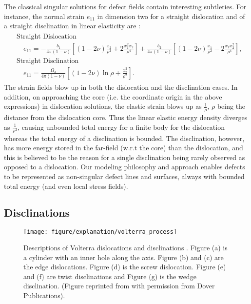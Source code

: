 \documentclass[11pt,letterpaper]{article}
\begin{document}
The classical singular solutions for defect fields contain interesting subtleties. For instance, the normal strain $e_{11}$ in dimension two for a straight dislocation and of a straight disclination in linear elasticity are \cite{dewit1971relation, de1973theory}:
\begin{eqnarray*}
\begin{aligned}
&\text{Straight Dislocation} \\
&\quad e_{11} = -\frac{b_1}{4\pi\left(1-\nu\right)}[\left(1-2\nu\right)\frac{x_2}{\rho^2}+2\frac{x_1^2x_2}{\rho^4}]+\frac{b_2}{4\pi\left(1-\nu\right)}[\left(1-2\nu\right)\frac{x_1}{\rho^2}-2\frac{x_1x_2^2}{\rho^4}], \\ 
&\text{Straight Disclination} \\
&\quad e_{11} = \frac{\Omega_3}{4\pi(1-\nu)}[(1-2\nu)\ln\rho+\frac{x_2^2}{\rho^2}].
\end{aligned}
\end{eqnarray*}
The strain fields blow up in both the dislocation and the disclination cases. In addition, on approaching the core (i.e. the coordinate origin in the above expressions) in dislocation solutions, the elastic strain blows up as $\frac{1}{\rho}$, $\rho$ being the distance from the dislocation core. Thus the linear elastic energy density diverges as $\frac{1}{\rho^2}$, causing unbounded total energy for a finite body for the dislocation whereas the total energy of a disclination is bounded. The disclination, however, has more energy stored in the far-field (w.r.t the core) than the dislocation, and this is believed to be the reason for a single disclination being rarely observed as opposed to a dislocation. Our modeling philosophy and approach enables defects to be represented as non-singular defect lines and surfaces, always with bounded total energy (and even local stress fields).


\subsection{Disclinations}

\begin {figure}%
\centering
\texttt{[image: figure/explanation/volterra\_process]}
\caption{Descriptions of Volterra dislocations and disclinations . Figure (a) is a cylinder with an inner hole along the axis. Figure (b) and (c) are the edge dislocations. Figure (d) is the screw dislocation. Figure (e) and (f) are twist disclinations and Figure (g) is the wedge disclination. (Figure reprinted from \cite{Nabarro1987} with permission from Dover Publications).}
\label{fig:cylinder}
\end {figure}
\end{document}
